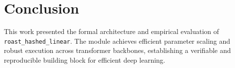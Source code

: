 \section{Conclusion}
This work presented the formal architecture and empirical evaluation of \texttt{roast_hashed_linear}. The module achieves efficient parameter scaling and robust execution across transformer backbones, establishing a verifiable and reproducible building block for efficient deep learning.
